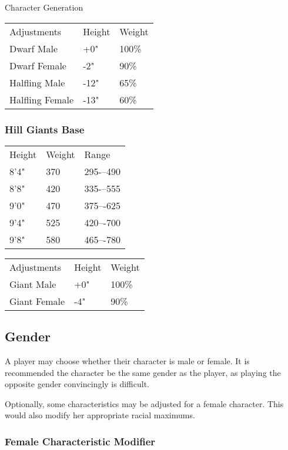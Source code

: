 \begin{Chapter}{Character Generation}
\begin{tabularx}{\columnwidth}{lll} \\
Adjustments		& Height	& Weight \\
Dwarf Male		& +0"		& 100\% \\
Dwarf Female		& -2"		& 90\% \\
Halﬂing Male		& -12"		& 65\% \\
Halﬂing Female		& -13"		& 60\% \\
\end{tabularx}

\subsubsection{Hill Giants Base}


\begin{tabularx}{\columnwidth}{lll}
Height		& Weight	& Range \\
8’4"		& 370		& 295-–490 \\
8’8"		& 420		& 335-–555 \\
9’0"		& 470		& 375–-625 \\
9’4"		& 525		& 420–-700 \\
9’8"		& 580		& 465–-780 \\
\end{tabularx}

\begin{tabularx}{\columnwidth}{lll}
Adjustments	& Height	& Weight \\
Giant Male	& +0"		& 100\% \\
Giant Female	& -4"		& 90\% \\
\end{tabularx}

\subsection{Gender}

A player may choose whether their character is male or female.  It is
recommended the character be the same gender as the player, as playing
the opposite gender convincingly is difficult.

Optionally, some characteristics may be adjusted for a female
character.  This would also modify her appropriate racial maximums.

\subsubsection{Female Characteristic Modifier}


\end{Chapter}
